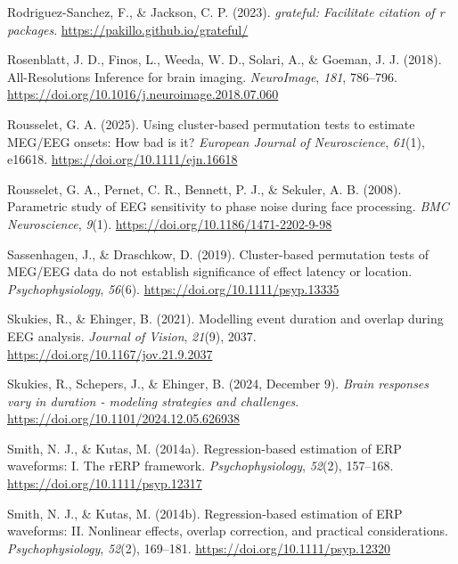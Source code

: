 \documentclass[
  doc,
  floatsintext,
  longtable,
  a4paper,
  nolmodern,
  notxfonts,
  notimes,
  colorlinks=true,linkcolor=blue,citecolor=blue,urlcolor=blue]{apa7}
\newlength{\cslhangindent}
\newenvironment{CSLReferences}[2] %
 {\begin{list}{}{%
  \setlength{\itemindent}{0pt}
  \setlength{\leftmargin}{0pt}
  \setlength{\parsep}{0pt}
  \ifodd #1
   \setlength{\leftmargin}{\cslhangindent}
   \setlength{\itemindent}{-1\cslhangindent}
  \fi
  \setlength{\itemsep}{#2\baselineskip}}}
 {\end{list}}
\begin{document}
\begin{CSLReferences}{1}{0}
Rodriguez-Sanchez, F., \& Jackson, C. P. (2023). \emph{{grateful}:
Facilitate citation of r packages}.
\url{https://pakillo.github.io/grateful/}

Rosenblatt, J. D., Finos, L., Weeda, W. D., Solari, A., \& Goeman, J. J.
(2018). All-Resolutions Inference for brain imaging. \emph{NeuroImage},
\emph{181}, 786--796.
\url{https://doi.org/10.1016/j.neuroimage.2018.07.060}

Rousselet, G. A. (2025). Using cluster-based permutation tests to
estimate {MEG}/{EEG} onsets: {How} bad is it? \emph{European Journal of
Neuroscience}, \emph{61}(1), e16618.
\url{https://doi.org/10.1111/ejn.16618}

Rousselet, G. A., Pernet, C. R., Bennett, P. J., \& Sekuler, A. B.
(2008). Parametric study of EEG sensitivity to phase noise during face
processing. \emph{BMC Neuroscience}, \emph{9}(1).
\url{https://doi.org/10.1186/1471-2202-9-98}

Sassenhagen, J., \& Draschkow, D. (2019). Cluster{-}based permutation
tests of MEG/EEG data do not establish significance of effect latency or
location. \emph{Psychophysiology}, \emph{56}(6).
\url{https://doi.org/10.1111/psyp.13335}

Skukies, R., \& Ehinger, B. (2021). Modelling event duration and overlap
during {EEG} analysis. \emph{Journal of Vision}, \emph{21}(9), 2037.
\url{https://doi.org/10.1167/jov.21.9.2037}

Skukies, R., Schepers, J., \& Ehinger, B. (2024, December 9).
\emph{Brain responses vary in duration - modeling strategies and
challenges}. \url{https://doi.org/10.1101/2024.12.05.626938}

Smith, N. J., \& Kutas, M. (2014a). Regression{-}based estimation of ERP
waveforms: I. The rERP framework. \emph{Psychophysiology}, \emph{52}(2),
157--168. \url{https://doi.org/10.1111/psyp.12317}

Smith, N. J., \& Kutas, M. (2014b). Regression{-}based estimation of ERP
waveforms: II. Nonlinear effects, overlap correction, and practical
considerations. \emph{Psychophysiology}, \emph{52}(2), 169--181.
\url{https://doi.org/10.1111/psyp.12320}


\end{CSLReferences}
\end{document}
